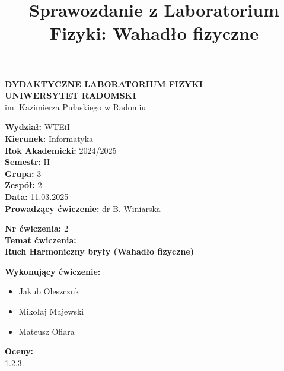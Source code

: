\documentclass[12pt]{article}
\title{Sprawozdanie z Laboratorium Fizyki: Wahadło fizyczne}
\date{}
\begin{document}
\begin{titlepage}
    \centering
    \Large
    \textbf{DYDAKTYCZNE LABORATORIUM FIZYKI} \\
    \vspace{0.2cm}
    \textbf{UNIWERSYTET RADOMSKI}\\
    im. Kazimierza Pułaskiego w Radomiu \\
    
    \vspace{1.5cm}
    \begin{flushleft}
        \textbf{Wydział:} {WTEiI} \\
        \textbf{Kierunek:} Informatyka \\
        \textbf{Rok Akademicki:} 2024/2025 \\
        \textbf{Semestr:} II \\
        \textbf{Grupa:} 3 \\
        \textbf{Zespół:} 2 \\
        \textbf{Data:} 11.03.2025 \\
        \textbf{Prowadzący ćwiczenie:} dr B. Winiarska \\
    \end{flushleft}
    
    \vspace{1cm}
    \begin{flushleft}
        \textbf{Nr ćwiczenia:} 2 \\
        \textbf{Temat ćwiczenia:} \\
        \textbf{Ruch Harmoniczny bryły (Wahadło fizyczne)} \\
    \end{flushleft}
    
    \vspace{1cm}
    \begin{flushleft}
        \textbf{Wykonujący ćwiczenie:}
        \begin{itemize}
            \item Jakub Oleszczuk
            \item Mikołaj Majewski
            \item Mateusz Ofiara
        \end{itemize}
    \end{flushleft}

    \vfill
    \begin{flushleft}
        \textbf{Oceny:} \\
        1.\hspace{2cm}2.\hspace{2cm}3.
    \end{flushleft}
\end{titlepage}
\end{document}

